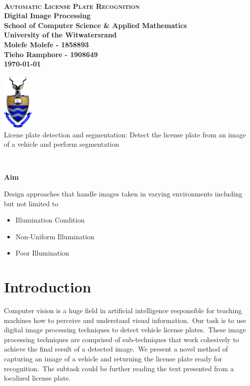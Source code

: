 \documentclass[a4paper,twoside,10pt]{report}
\renewenvironment{abstract}{\ \vfill\begin{center}\textbf{Aim}\end{center}\addcontentsline{toc}{section}{Abstract}}{\vfill\vfill\newpage}
\begin{document}
\onecolumn
\thispagestyle{empty}

\setcounter{page}{0}
\ 
\begin{center}
  \vfill
  {
  \huge \bf \textsc{Automatic License Plate Recognition}\\
  \large Digital Image Processing \\[20pt]
  \large School of Computer Science \& Applied Mathematics\\
  \large University of the Witwatersrand\\[20pt]
  \normalsize
  Molefe Molefe - 1858893\\
  Tieho Ramphore  - 1908649\\[10pt]
  

  \today
  }

  \vfill
  \vfill
  \includegraphics[width=1.5cm]{images/wits}
  \vspace{10pt}\\
  \small{Licene plate detection and segmentation: Detect the license plate from an image of a vehicle and perform segmentation}\\
\end{center}
\vfill
\newpage

\pagestyle{plain}
\setcounter{page}{1}

\begin{abstract}
Design approaches that handle images taken in varying environments including but not limited to
\begin{itemize}
  \item Illumination Condition
  \item Non-Uniform Illumination
  \item Poor Illumination
\end{itemize}
\end{abstract}



{}
\tableofcontents
\newpage
{}
\newpage
{}
\newpage
{}

\chapter{Introduction}
Computer vision is a huge field in artificial intelligence responsible for teaching machines how to perceive and understand visual information.\
Our task is to use digital image processing techniques to detect vehicle license plates.\ 
These image processing techniques are comprised of sub-techniques that work cohesively to achieve the final result of a detected image.\ 
We present a novel method of capturing an image of a vehicle and returning the license plate ready for recognition.\ 
The subtask could be further reading the text presented from a localized license plate. \\ [4pt]
\end{document}
